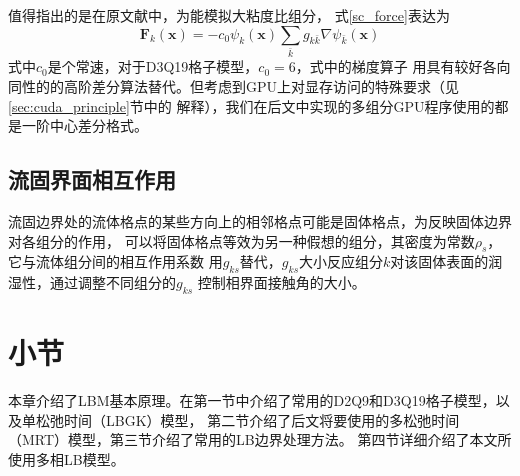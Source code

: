值得指出的是在原文献中，为能模拟大粘度比组分，
式\eqref{sc_force}表达为
\begin{equation}
\bm F_k(\bm x) = -c_0\psi_k(\bm x)\sum_{\bar k}g_{k\bar k}\nabla \psi_{\bar k}(\bm x)
\label{sc_force_m}
\end{equation}
式中$c_0$是个常速，对于D3Q19格子模型，$c_0 =6$，式中的梯度算子
用具有较好各向同性的的高阶差分算法替代。但考虑到GPU上对显存访问的特殊要求（见\ref{sec:cuda_principle}节中的
解释），我们在后文中实现的多组分GPU程序使用的都是一阶中心差分格式。

\subsection{流固界面相互作用}
流固边界处的流体格点的某些方向上的相邻格点可能是固体格点，为反映固体边界对各组分的作用，
可以将固体格点等效为另一种假想的组分，其密度为常数$\rho_s$，它与流体组分间的相互作用系数
用$g_{ks}$替代，$g_{ks}$大小反应组分$k$对该固体表面的润湿性，通过调整不同组分的$g_{ks}$
控制相界面接触角的大小。


\section{小节}
本章介绍了LBM基本原理。在第一节中介绍了常用的D2Q9和D3Q19格子模型，以及单松弛时间（LBGK）模型，
第二节介绍了后文将要使用的多松弛时间（MRT）模型，第三节介绍了常用的LB边界处理方法。
第四节详细介绍了本文所使用多相LB模型。







